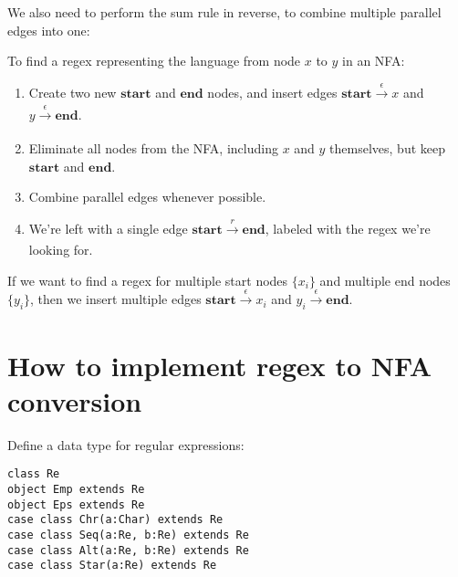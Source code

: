\documentclass[a4paper, 11pt]{article}
\theoremstyle{definition}
\begin{document}
\noindent We also need to perform the sum rule in reverse, to combine multiple parallel edges into one:

\begin{center}
\end{center}

\noindent To find a regex representing the language from node $x$ to $y$ in an NFA:\bigskip

\begin{enumerate}
  \item Create two new $\mathbf{start}$ and $\mathbf{end}$ nodes, and insert edges $\mathbf{start} \xrightarrow[]{\epsilon} x$ and $y \xrightarrow[]{\epsilon} \mathbf{end}$.
  \item Eliminate all nodes from the NFA, including $x$ and $y$ themselves, but keep $\mathbf{start}$ and $\mathbf{end}$.
  \item Combine parallel edges whenever possible.
  \item We're left with a single edge $\mathbf{start} \xrightarrow[]{r} \mathbf{end}$, labeled with the regex we're looking for.
\end{enumerate}

\bigskip

\noindent If we want to find a regex for multiple start nodes $\{x_i\}$ and multiple end nodes $\{y_i\}$, then we insert multiple edges $\mathbf{start} \xrightarrow[]{\epsilon} x_i$ and $y_i \xrightarrow[]{\epsilon} \mathbf{end}$.

\newpage
\section{How to implement regex to NFA conversion}

Define a data type for regular expressions:

\begin{lstlisting}
class Re
object Emp extends Re
object Eps extends Re
case class Chr(a:Char) extends Re
case class Seq(a:Re, b:Re) extends Re
case class Alt(a:Re, b:Re) extends Re
case class Star(a:Re) extends Re
\end{lstlisting}
\end{document}
